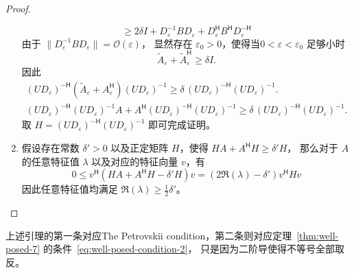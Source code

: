 \begin{proof}
\begin{enumerate}
\[                  \ge{}  2 \delta I + D_\varepsilon^{-1} B D_\varepsilon + D_\varepsilon^{\mathsf{H}} B^{\mathsf{H}} D_\varepsilon^{-\mathsf{H}}
              \]
              由于 $\|D_\varepsilon^{-1} B D_\varepsilon\| = \mathcal{O}(\varepsilon)$，
              显然存在 $\varepsilon_0 > 0$，使得当$ 0 < \varepsilon < \varepsilon_0$ 足够小时
              \[
                  \widetilde{A}_\varepsilon + \widetilde{A}^{\mathsf{H}}_\varepsilon \ge \delta I.
              \]
              因此
              \begin{gather*}
                  (U D_\varepsilon)^{-\mathsf{H}} (\widetilde{A}_\varepsilon + A^{\mathsf{H}}_\varepsilon) (U D_\varepsilon)^{-1} \ge \delta\,(U D_\varepsilon)^{-\mathsf{H}} (U D_\varepsilon)^{-1}.
                  \\
                  (U D_\varepsilon)^{-\mathsf{H}} (U D_\varepsilon)^{-1} A + A^{\mathsf{H}} (U D_\varepsilon)^{-\mathsf{H}} (U D_\varepsilon)^{-1} \ge \delta\,(U D_\varepsilon)^{-\mathsf{H}} (U D_\varepsilon)^{-1}.
              \end{gather*}
              取 $H = (U D_\varepsilon)^{-\mathsf{H}} (U D_\varepsilon)^{-1}$ 即可完成证明。
        \item 假设存在常数 $\delta' >0$ 以及正定矩阵 $H$，使得 $H A + A^{\mathsf{H}} H \ge \delta' H$，
              那么对于 $A$ 的任意特征值 $\lambda$ 以及对应的特征向量 $v$，有
              \[
                  0 \le v^{\mathsf{H}} (H A + A^{\mathsf{H}} H - \delta' H) v =  (2 \Re(\lambda) - \delta') v^{\mathsf{H}} H v
              \]
              因此任意特征值均满足 $\Re(\lambda) \ge \frac12\delta'$。
    \end{enumerate}
\end{proof}

\begin{remark}
    上述引理的第一条对应The Petrovskii condition，第二条则对应定理~\ref{thm:well-posed-7} 的条件~\eqref{eq:well-posed-condition-2}，
    只是因为二阶导使得不等号全部取反。
\end{remark}

